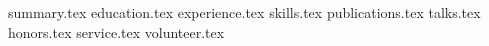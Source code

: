 \documentclass[11pt, a4paper,british]{awesome-cv}
\newcommand*{\sectiondir}{resume/}
\begin{document}
\makecvheader

{summary.tex}
{education.tex}
{experience.tex}
{skills.tex}
{publications.tex}
{talks.tex}
{honors.tex}
{service.tex}
{volunteer.tex}
\end{document}
